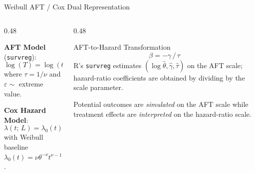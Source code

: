 \documentclass[
  ignorenonframetext,
  aspectratio=169]{beamer}
\begin{document}
\begin{frame}{Weibull AFT / Cox Dual Representation}
\label{weibull-aft-cox-dual-representation}
\begin{columns}[T]
\begin{column}{0.48\textwidth}

\textbf{AFT Model} (\texttt{survreg}):
$$\log(T) = \log(\theta) + L'\gamma + \tau\varepsilon$$
where $\tau = 1/\nu$ and $\varepsilon \sim$ extreme value.

\medskip

\textbf{Cox Hazard Model}:
$$\lambda(t;\, L) = \lambda_{0}(t)\,\exp(L'\beta)$$
with Weibull baseline $\lambda_{0}(t) = \nu\theta^{-\nu}t^{\nu-1}$.

\end{column}
\begin{column}{0.48\textwidth}

\begin{alertblock}{AFT-to-Hazard Transformation}
$$\beta = -\gamma\,/\,\tau$$
R's \texttt{survreg} estimates $(\log\hat{\theta}, \hat{\gamma}, \hat{\tau})$ on the AFT scale; hazard-ratio coefficients are obtained by dividing by the scale parameter.
\end{alertblock}

\medskip

Potential outcomes are \emph{simulated} on the AFT scale while treatment effects are \emph{interpreted} on the hazard-ratio scale.

\end{column}
\end{columns}
\end{frame}
\end{document}
